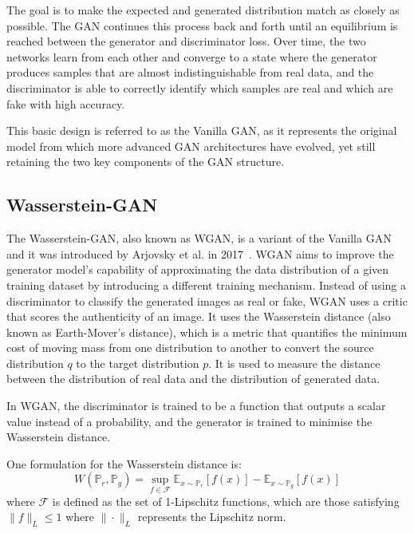 \newpage
\noindent The goal is to make the expected and generated distribution match as closely as possible. 
The GAN continues this process back and forth until an equilibrium is reached between the generator and discriminator loss. Over time, the two networks learn from each other and converge to a state where the generator produces samples that are almost indistinguishable from real data, and the discriminator is able to correctly identify which samples are real and which are fake with high accuracy.

\noindent This basic design is referred to as the Vanilla GAN, as it represents the original model from which more advanced GAN architectures have evolved, yet still retaining the two key components of the GAN structure.
\subsection{Wasserstein-GAN}
\label{sec:wgan}
The Wasserstein-GAN, also known as WGAN, is a variant of the Vanilla GAN and it was introduced by Arjovsky et al. in 2017~\cite{wgan}. WGAN aims to improve the generator model's capability of approximating the data distribution of a given training dataset by introducing a different training mechanism. 
Instead of using a discriminator to classify the generated images as real or fake, WGAN uses a critic that scores the authenticity of an image. It uses the Wasserstein distance (also known as Earth-Mover's distance), which is a metric that quantifies the minimum cost of moving mass from one distribution to another to convert the source distribution $q$ to the target distribution $p$. It is used to measure the distance between the distribution of real data and the distribution of generated data.

\noindent In WGAN, the discriminator is trained to be a function that outputs a scalar value instead of a probability, and the generator is trained to minimise the Wasserstein distance.

\noindent One formulation for the Wasserstein distance is:
\begin{equation}
    \label{eq:waaserstein distance}
    W(\mathbb{P}_r , \mathbb{P}_g)= \sup_{f \in \mathcal{F}} \mathbb{E}_{x\sim \mathbb{P}_r}[f(x)] - \mathbb{E}_{x \sim \mathbb{P}_g}[f(x)]
\end{equation}
where $\mathcal{F}$ is defined as the set of 1-Lipschitz functions, which are those satisfying $\|f\|_L \leq 1$ where $\| \cdot \|_L$ represents the Lipschitz norm.

